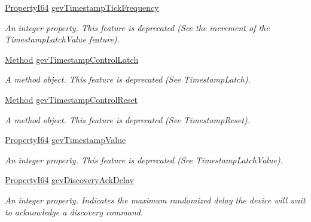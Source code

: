 \begin{DoxyCompactItemize}
\hyperlink{group___common_interface_ga81749b2696755513663492664a18a893}{Property\+I64} \hyperlink{classmv_i_m_p_a_c_t_1_1acquire_1_1_gen_i_cam_1_1_transport_layer_control_a2cd5a80f9d9c41abb2fb4d46dfd1db74}{gev\+Timestamp\+Tick\+Frequency}
\begin{DoxyCompactList}\small\item\em An integer property. This feature is deprecated (See the increment of the Timestamp\+Latch\+Value feature). \end{DoxyCompactList}\item 
\hyperlink{classmv_i_m_p_a_c_t_1_1acquire_1_1_method}{Method} \hyperlink{classmv_i_m_p_a_c_t_1_1acquire_1_1_gen_i_cam_1_1_transport_layer_control_a57adc9d8ec47465e1f2dc1e1807517e2}{gev\+Timestamp\+Control\+Latch}
\begin{DoxyCompactList}\small\item\em A method object. This feature is deprecated (See Timestamp\+Latch). \end{DoxyCompactList}\item 
\hyperlink{classmv_i_m_p_a_c_t_1_1acquire_1_1_method}{Method} \hyperlink{classmv_i_m_p_a_c_t_1_1acquire_1_1_gen_i_cam_1_1_transport_layer_control_a8756dbc39c18e2b1c21afd9d5a2eb68d}{gev\+Timestamp\+Control\+Reset}
\begin{DoxyCompactList}\small\item\em A method object. This feature is deprecated (See Timestamp\+Reset). \end{DoxyCompactList}\item 
\hyperlink{group___common_interface_ga81749b2696755513663492664a18a893}{Property\+I64} \hyperlink{classmv_i_m_p_a_c_t_1_1acquire_1_1_gen_i_cam_1_1_transport_layer_control_afdf9e13e89c38f15b6bbc80976f14cbe}{gev\+Timestamp\+Value}
\begin{DoxyCompactList}\small\item\em An integer property. This feature is deprecated (See Timestamp\+Latch\+Value). \end{DoxyCompactList}\item 
\hyperlink{group___common_interface_ga81749b2696755513663492664a18a893}{Property\+I64} \hyperlink{classmv_i_m_p_a_c_t_1_1acquire_1_1_gen_i_cam_1_1_transport_layer_control_a764f47d6ce3db83967b127825b831bb7}{gev\+Discovery\+Ack\+Delay}
\begin{DoxyCompactList}\small\item\em An integer property. Indicates the maximum randomized delay the device will wait to acknowledge a discovery command. \end{DoxyCompactList}\item 

\end{DoxyCompactItemize}
